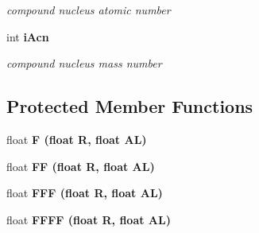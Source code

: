 \begin{CompactItemize}
\begin{CompactList}\small\item\em compound nucleus atomic number \item\end{CompactList}\item 
int \bf{i\-Acn}\label{classCFus_53a571394258402cce8439d8e87bdecf}

\begin{CompactList}\small\item\em compound nucleus mass number \item\end{CompactList}\end{CompactItemize}
\subsection*{Protected Member Functions}
\begin{CompactItemize}
\item 
float \bf{F} (float R, float AL)
\item 
float \bf{FF} (float R, float AL)
\item 
float \bf{FFF} (float R, float AL)
\item 
float \bf{FFFF} (float R, float AL)
\end{CompactItemize}
